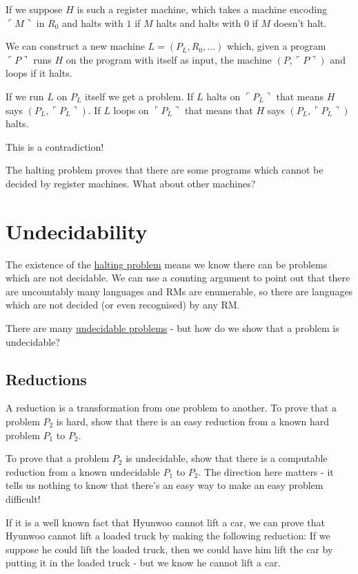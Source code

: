 \documentclass{article}
\begin{document}
If we suppose $H$ is such a register machine, which takes a machine encoding $\ulcorner M \urcorner$ in $R_0$ and halts with $1$ if $M$ halts and halts with $0$ if $M$ doesn't halt.

We can construct a new machine $L = (P_L, R_0, \dots)$ which, given a program $\ulcorner P \urcorner$ runs $H$ on the program with itself as input, the machine $(P, \ulcorner P \urcorner)$ and loops if it halts.

If we run $L$ on $P_L$ itself we get a problem. If $L$ halts on $\ulcorner P_L \urcorner$ that means $H$ says $(P_L, \ulcorner P_L \urcorner)$. If $L$ loops on $\ulcorner P_L \urcorner$ that means that $H$ says $(P_L, \ulcorner P_L \urcorner)$ halts.

This is a contradiction!

The halting problem proves that there are some programs which cannot be decided by register machines. What about other machines?

\newpage

\section{Undecidability}\label{undecidable}
The existence of the \hyperref[halting]{halting problem} means we know there can be problems which are not decidable. We can use a counting argument to point out that there are uncountably many languages and RMs are enumerable, so there are languages which are not decided (or even recognised) by any RM.

There are many \hyperref[undecidable-problems]{undecidable problems} - but how do we show that a problem is undecidable?

\subsection{Reductions}
A reduction is a transformation from one problem to another. To prove that a problem $P_2$ is hard, show that there is an easy reduction from a known hard problem $P_1$ to $P_2$.

To prove that a problem $P_2$ is undecidable, show that there is a computable reduction from a known undecidable $P_1$ to $P_2$. The direction here matters - it tells us nothing to know that there's an easy way to make an easy problem difficult!

If it is a well known fact that Hyunwoo cannot lift a car, we can prove that Hyunwoo cannot lift a loaded truck by making the following reduction: If we suppose he could lift the loaded truck, then we could have him lift the car by putting it in the loaded truck - but we know he cannot lift a car.
\end{document}
